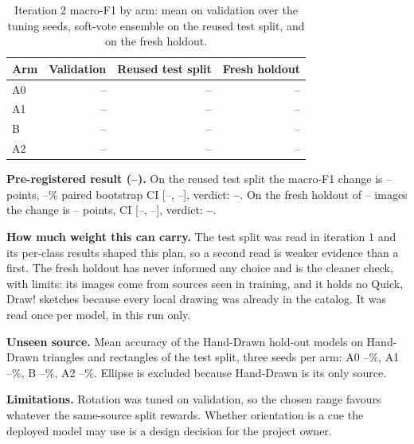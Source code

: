 \documentclass[11pt]{article}
\providecommand{\ItwoPrimary}{--}
\providecommand{\ItwoDelta}{--}
\providecommand{\ItwoCILo}{--}
\providecommand{\ItwoCIHi}{--}
\providecommand{\ItwoVerdict}{--}
\providecommand{\ItwoFreshN}{--}
\providecommand{\ItwoFreshDelta}{--}
\providecommand{\ItwoFreshCILo}{--}
\providecommand{\ItwoFreshCIHi}{--}
\providecommand{\ItwoFreshVerdict}{--}
\providecommand{\ItwoEnsAzero}{--}
\providecommand{\ItwoEnsAone}{--}
\providecommand{\ItwoEnsB}{--}
\providecommand{\ItwoEnsAtwo}{--}
\providecommand{\ItwoFreshAzero}{--}
\providecommand{\ItwoFreshAone}{--}
\providecommand{\ItwoFreshB}{--}
\providecommand{\ItwoFreshAtwo}{--}
\providecommand{\ItwoValAzero}{--}
\providecommand{\ItwoValAone}{--}
\providecommand{\ItwoValB}{--}
\providecommand{\ItwoValAtwo}{--}
\providecommand{\ItwoLosoAzero}{--}
\providecommand{\ItwoLosoAone}{--}
\providecommand{\ItwoLosoB}{--}
\providecommand{\ItwoLosoAtwo}{--}
\providecommand{\CILevelPct}{--}
\begin{document}
\begin{table}[H]
\centering
\caption{Iteration 2 macro-F1 by arm: mean on validation over the tuning seeds,
soft-vote ensemble on the reused test split, and on the fresh holdout.}
\label{tab:itertwo}
\begin{tabular}{lrrr}
\toprule
Arm & Validation & Reused test split & Fresh holdout \\
\midrule
A0 & \ItwoValAzero & \ItwoEnsAzero & \ItwoFreshAzero \\
A1 & \ItwoValAone & \ItwoEnsAone & \ItwoFreshAone \\
B & \ItwoValB & \ItwoEnsB & \ItwoFreshB \\
A2 & \ItwoValAtwo & \ItwoEnsAtwo & \ItwoFreshAtwo \\
\bottomrule
\end{tabular}
\end{table}

\textbf{Pre-registered result (\ItwoPrimary).} On the reused test split the
macro-F1 change is \ItwoDelta{} points, \CILevelPct\% paired bootstrap CI
[\ItwoCILo, \ItwoCIHi], verdict: \textbf{\ItwoVerdict}. On the fresh holdout of
\ItwoFreshN{} images the change is \ItwoFreshDelta{} points, CI
[\ItwoFreshCILo, \ItwoFreshCIHi], verdict: \textbf{\ItwoFreshVerdict}.

\textbf{How much weight this can carry.} The test split was read in iteration 1
and its per-class results shaped this plan, so a second read is weaker evidence
than a first. The fresh holdout has never informed any choice and is the cleaner
check, with limits: its images come from sources seen in training, and it holds
no Quick, Draw! sketches because every local drawing was already in the catalog.
It was read once per model, in this run only.

\textbf{Unseen source.} Mean accuracy of the Hand-Drawn hold-out models on
Hand-Drawn triangles and rectangles of the test split, three seeds per arm:
A0 \ItwoLosoAzero\%, A1 \ItwoLosoAone\%, B \ItwoLosoB\%, A2 \ItwoLosoAtwo\%.
Ellipse is excluded because Hand-Drawn is its only source.

\textbf{Limitations.} Rotation was tuned on validation, so the chosen range
favours whatever the same-source split rewards. Whether orientation is a cue
the deployed model may use is a design decision for the project owner.

\begin{table}[H]
\centering
\caption{Iteration 2 comparisons on the reused test split.}
\small
{}
\end{table}
\end{document}
